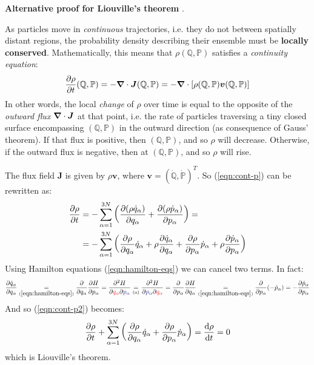 \documentclass[../../main.tex]{subfiles}
\begin{document}
\begin{appr}\textbf{Alternative proof for Liouville's theorem} \cite[Chapter~4.1]{sethna}. 

    \medskip

    As particles move in \textit{continuous} trajectories, i.e. they do not  between spatially distant regions, the probability density describing their ensemble must be \textbf{locally conserved}. Mathematically, this means that $\rho(\mathbb{Q}, \mathbb{P})$ satisfies a \textit{continuity equation}:
    \begin{align} \label{eqn:cont-p}
        {\pdv{\rho}{t}} (\mathbb{Q}, \mathbb{P}) = - \grad \cdot \bm{J} (\mathbb{Q}, \mathbb{P}) = - \grad \cdot  [\rho(\mathbb{Q}, \mathbb{P}) \bm{v} (\mathbb{Q},\mathbb{P})]
    \end{align}   
    In other words, the local \textit{change} of $\rho$ over time is equal to the opposite of the \textit{outward flux} $\grad \cdot \bm{J}$ at that point, i.e. the rate of particles traversing a tiny closed surface encompassing $(\mathbb{Q}, \mathbb{P})$ in the outward direction (as consequence of Gauss' theorem). If that flux is positive, then  $(\mathbb{Q}, \mathbb{P})$, and so $\rho$ will decrease. Otherwise, if the outward flux is negative, then  at $(\mathbb{Q}, \mathbb{P})$, and so $\rho$ will rise.

    \medskip

    The flux field $\bm{J}$ is given by $\rho \bm{v}$, where $\bm{v} = (\dot{\mathbb{Q}}, \dot{\mathbb{P}})^T$. So (\ref{eqn:cont-p}) can be rewritten as:
    \begin{align}\nonumber
        \pdv{\rho}{t} &= - \sum_{\alpha=1}^{3N} \left(\pdv{(\rho \dot{q}_\alpha)}{q_\alpha} + \pdv{(\rho \dot{p}_\alpha)}{p_\alpha}\right) = \\
        &= - \sum_{\alpha=1}^{3N} \left(\pdv{\rho}{q_\alpha} \dot{q}_\alpha + \rho \pdv{\dot{q}_\alpha}{q_\alpha}  + \pdv{\rho}{p_\alpha} \dot{p}_\alpha + \rho \pdv{\dot{p}_\alpha}{p_\alpha}\right) \label{eqn:cont-p2}
    \end{align}
    Using Hamilton equations (\ref{eqn:hamilton-eqs}) we can cancel two terms. In fact:
    \begin{align*}
        \pdv{\dot{q}_\alpha}{q_\alpha} \underset{(\ref{eqn:hamilton-eqs})}{=} \pdv{q_\alpha} \pdv{H}{p_\alpha} = \pdv[2]{H}{\textcolor{Red}{q_\alpha}}{\textcolor{Blue}{p_\alpha}} \underset{(a)}{=} \pdv[2]{H}{\textcolor{Blue}{p_\alpha}}{\textcolor{Red}{q_\alpha}} = \pdv{p_\alpha} \pdv{H}{q_\alpha} \underset{(\ref{eqn:hamilton-eqs})}{=} \pdv{p_\alpha} (-\dot{p}_\alpha) = - \pdv{\dot{p}_\alpha}{p_\alpha}
    \end{align*}
    And so (\ref{eqn:cont-p2}) becomes:
    \begin{align*}
        \pdv{\rho}{t} + \sum_{\alpha=1}^{3N} \left( \pdv{\rho}{q_\alpha} \dot{q}_\alpha + \pdv{\rho}{p_\alpha} \dot{p}_\alpha\right) = \dv{\rho}{t} = 0
    \end{align*}
    which is Liouville's theorem.
\end{appr}
\end{document}
